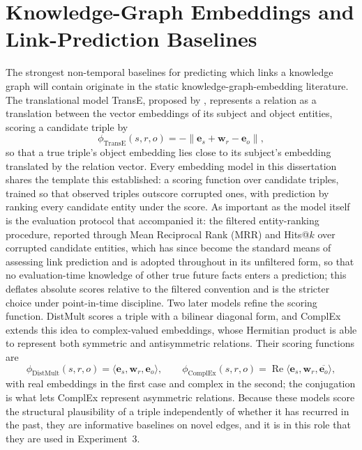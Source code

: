 \documentclass[a4paper,12pt]{report}
\begin{document}
\section{Knowledge-Graph Embeddings and Link-Prediction Baselines}
\label{sec:kgembed}
The strongest non-temporal baselines for predicting which links a knowledge graph will contain
originate in the static knowledge-graph-embedding literature. The translational
model TransE, proposed by \citet{Bordes2013TransE}, represents a relation as a
translation between the vector embeddings of its subject and object entities,
scoring a candidate triple by
\begin{equation}
\phi_{\mathrm{TransE}}(s, r, o) = -\lVert \mathbf{e}_s + \mathbf{w}_r -
\mathbf{e}_o \rVert,
\label{eq:transe}
\end{equation}
so that a true triple's object embedding lies close to its subject's
embedding translated by the relation vector. Every embedding model in
this dissertation shares the template this established: a scoring
function over candidate triples, trained so that observed triples
outscore corrupted ones, with prediction by ranking every candidate
entity under the score. As
important as the model itself is the evaluation protocol
that accompanied it: the filtered entity-ranking procedure, reported through Mean
Reciprocal Rank (MRR) and Hits@$k$ over corrupted candidate entities, which has
since become the standard means of assessing link prediction and is adopted
throughout in its unfiltered
form, so that no evaluation-time knowledge of other true future facts enters a
prediction; this deflates absolute scores relative to the filtered convention
and is the stricter choice under point-in-time discipline. Two later models refine the scoring function.
DistMult \citep{Yang2015DistMult} scores a triple with a bilinear diagonal form,
and ComplEx \citep{Trouillon2016ComplEx} extends this idea to complex-valued
embeddings, whose Hermitian product is able to represent both symmetric and
antisymmetric relations. Their scoring functions are
\begin{equation}
\phi_{\mathrm{DistMult}}(s, r, o) = \langle \mathbf{e}_s, \mathbf{w}_r,
\mathbf{e}_o \rangle, \qquad
\phi_{\mathrm{ComplEx}}(s, r, o) = \operatorname{Re} \langle \mathbf{e}_s,
\mathbf{w}_r, \overline{\mathbf{e}_o} \rangle,
\label{eq:scoring}
\end{equation}
with real embeddings in the first case and complex in the second; the
conjugation is what lets ComplEx represent asymmetric relations. Because these models score the structural plausibility
of a triple independently of whether it has recurred in the past, they are
informative baselines on novel edges, and it is in this role
that they are used in Experiment~3.
\end{document}
